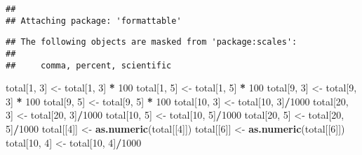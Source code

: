 \documentclass[]{tufte-handout}
\newenvironment{Shaded}{\begin{snugshade}}{\end{snugshade}}
\newcommand{\KeywordTok}[1]{\textcolor[rgb]{0.13,0.29,0.53}{\textbf{#1}}}
\newcommand{\DecValTok}[1]{\textcolor[rgb]{0.00,0.00,0.81}{#1}}
\newcommand{\StringTok}[1]{\textcolor[rgb]{0.31,0.60,0.02}{#1}}
\newcommand{\OperatorTok}[1]{\textcolor[rgb]{0.81,0.36,0.00}{\textbf{#1}}}
\newcommand{\NormalTok}[1]{#1}
\begin{document}
\begin{verbatim}
## 
## Attaching package: 'formattable'
\end{verbatim}

\begin{verbatim}
## The following objects are masked from 'package:scales':
## 
##     comma, percent, scientific
\end{verbatim}

\begin{Shaded}
\begin{Highlighting}[]
\NormalTok{total[}\DecValTok{1}\NormalTok{, }\DecValTok{3}\NormalTok{] <-}\StringTok{ }\NormalTok{total[}\DecValTok{1}\NormalTok{, }\DecValTok{3}\NormalTok{] }\OperatorTok{*}\StringTok{ }\DecValTok{100}
\NormalTok{total[}\DecValTok{1}\NormalTok{, }\DecValTok{5}\NormalTok{] <-}\StringTok{ }\NormalTok{total[}\DecValTok{1}\NormalTok{, }\DecValTok{5}\NormalTok{] }\OperatorTok{*}\StringTok{ }\DecValTok{100}
\NormalTok{total[}\DecValTok{9}\NormalTok{, }\DecValTok{3}\NormalTok{] <-}\StringTok{ }\NormalTok{total[}\DecValTok{9}\NormalTok{, }\DecValTok{3}\NormalTok{] }\OperatorTok{*}\StringTok{ }\DecValTok{100}
\NormalTok{total[}\DecValTok{9}\NormalTok{, }\DecValTok{5}\NormalTok{] <-}\StringTok{ }\NormalTok{total[}\DecValTok{9}\NormalTok{, }\DecValTok{5}\NormalTok{] }\OperatorTok{*}\StringTok{ }\DecValTok{100}
\NormalTok{total[}\DecValTok{10}\NormalTok{, }\DecValTok{3}\NormalTok{] <-}\StringTok{ }\NormalTok{total[}\DecValTok{10}\NormalTok{, }\DecValTok{3}\NormalTok{]}\OperatorTok{/}\DecValTok{1000}
\NormalTok{total[}\DecValTok{20}\NormalTok{, }\DecValTok{3}\NormalTok{] <-}\StringTok{ }\NormalTok{total[}\DecValTok{20}\NormalTok{, }\DecValTok{3}\NormalTok{]}\OperatorTok{/}\DecValTok{1000}
\NormalTok{total[}\DecValTok{10}\NormalTok{, }\DecValTok{5}\NormalTok{] <-}\StringTok{ }\NormalTok{total[}\DecValTok{10}\NormalTok{, }\DecValTok{5}\NormalTok{]}\OperatorTok{/}\DecValTok{1000}
\NormalTok{total[}\DecValTok{20}\NormalTok{, }\DecValTok{5}\NormalTok{] <-}\StringTok{ }\NormalTok{total[}\DecValTok{20}\NormalTok{, }\DecValTok{5}\NormalTok{]}\OperatorTok{/}\DecValTok{1000}
\NormalTok{total[[}\DecValTok{4}\NormalTok{]] <-}\StringTok{ }\KeywordTok{as.numeric}\NormalTok{(total[[}\DecValTok{4}\NormalTok{]])}
\NormalTok{total[[}\DecValTok{6}\NormalTok{]] <-}\StringTok{ }\KeywordTok{as.numeric}\NormalTok{(total[[}\DecValTok{6}\NormalTok{]])}
\NormalTok{total[}\DecValTok{10}\NormalTok{, }\DecValTok{4}\NormalTok{] <-}\StringTok{ }\NormalTok{total[}\DecValTok{10}\NormalTok{, }\DecValTok{4}\NormalTok{]}\OperatorTok{/}\DecValTok{1000}

\end{Highlighting}
\end{Shaded}
\end{document}
